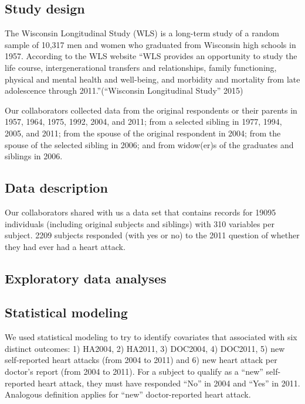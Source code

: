 \documentclass[11pt,]{article}
\begin{document}
\subsection{Study design}\label{study-design}

The Wisconsin Longitudinal Study (WLS) is a long-term study of a random
sample of 10,317 men and women who graduated from Wisconsin high schools
in 1957. According to the WLS website ``WLS provides an opportunity to
study the life course, intergenerational transfers and relationships,
family functioning, physical and mental health and well-being, and
morbidity and mortality from late adolescence through
2011.''(``Wisconsin Longitudinal Study'' 2015)


Our collaborators collected data from the original respondents or their
parents in 1957, 1964, 1975, 1992, 2004, and 2011; from a selected
sibling in 1977, 1994, 2005, and 2011; from the spouse of the original
respondent in 2004; from the spouse of the selected sibling in 2006; and
from widow(er)s of the graduates and siblings in 2006.

\subsection{Data description}\label{data-description}

Our collaborators shared with us a data set that contains records for
19095 individuals (including original subjects and siblings) with 310
variables per subject. 2209 subjects responded (with yes or no) to the
2011 question of whether they had ever had a heart attack.

\subsection{Exploratory data analyses}\label{exploratory-data-analyses}

\subsection{Statistical modeling}\label{statistical-modeling}

We used statistical modeling to try to identify covariates that
associated with six distinct outcomes: 1) HA2004, 2) HA2011, 3) DOC2004,
4) DOC2011, 5) new self-reported heart attacks (from 2004 to 2011) and
6) new heart attack per doctor's report (from 2004 to 2011). For a
subject to qualify as a ``new'' self-reported heart attack, they must
have responded ``No'' in 2004 and ``Yes'' in 2011. Analogous definition
applies for ``new'' doctor-reported heart attack.
\end{document}
